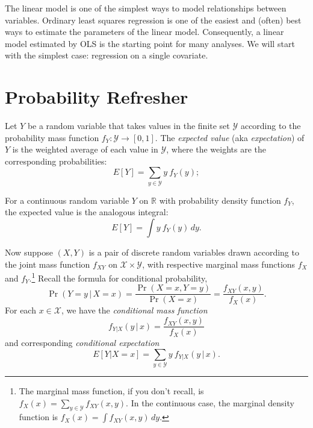 \documentclass[
  12pt,
  oneside,openany]{book}
\begin{document}
The linear model is one of the simplest ways to model relationships between variables. Ordinary least squares regression is one of the easiest and (often) best ways to estimate the parameters of the linear model. Consequently, a linear model estimated by OLS is the starting point for many analyses. We will start with the simplest case: regression on a single covariate.

\hypertarget{probability}{%
\section{Probability Refresher}\label{probability}}

Let \(Y\) be a random variable that takes values in the finite set \(\mathcal{Y}\) according to the probability mass function \(f_Y : \mathcal{Y} \to [0, 1]\). The \emph{expected value} (aka \emph{expectation}) of \(Y\) is the weighted average of each value in \(\mathcal{Y}\), where the weights are the corresponding probabilities:
\begin{equation}
E[Y] = \sum_{y \in \mathcal{Y}} y \: f_Y(y);
\end{equation}

For a continuous random variable \(Y\) on \(\mathbb{R}\) with probability density function \(f_Y\), the expected value is the analogous integral:
\begin{equation}
E[Y] = \int y \: f_Y(y) \, dy.
\end{equation}

Now suppose \((X, Y)\) is a pair of discrete random variables drawn according to the joint mass function \(f_{XY}\) on \(\mathcal{X} \times \mathcal{Y}\), with respective marginal mass functions \(f_X\) and \(f_Y\).\footnote{The marginal mass function, if you don't recall, is \(f_X(x) = \sum_{y \in \mathcal{Y}} f_{XY} (x, y)\). In the continuous case, the marginal density function is \(f_X(x) = \int f_{XY} (x, y) \, dy\).} Recall the formula for conditional probability,
\begin{equation}
\Pr(Y = y \,|\, X = x)
= \frac{\Pr(X = x, Y = y)}{\Pr(X = x)}
= \frac{f_{XY}(x, y)}{f_X(x)}.
\end{equation}
For each \(x \in \mathcal{X}\), we have the \emph{conditional mass function}
\begin{equation}
f_{Y|X}(y \,|\, x) = \frac{f_{XY}(x, y)}{f_X(x)}
\end{equation}
and corresponding \emph{conditional expectation}
\begin{equation}
E[Y | X = x]
= \sum_{y \in \mathcal{Y}} y \: f_{Y|X}(y \,|\, x).
\end{equation}
\end{document}
